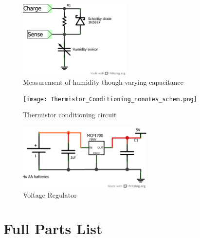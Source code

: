 \documentclass[a4paper,11pt]{article}  %
\begin{document}
\begin{figure}[!h]
  \begin{center}
    \includegraphics[width=0.5\textwidth]{humiditysensor_schem.png}
  \end{center}
  \caption{Measurement of humidity though varying capacitance}
  \label{fig:humcir}
\end{figure}

\begin{figure}[!h]
  \begin{center}
    \texttt{[image: Thermistor\_Conditioning\_nonotes\_schem.png]}
  \end{center}
  \caption{Thermistor conditioning circuit}
  \label{fig:tempcond}
\end{figure}

\begin{figure}[!h]
  \begin{center}
    \includegraphics[width=0.6\textwidth]{power_schem.png}
  \end{center}
  \caption{Voltage Regulator}
  \label{fig:voltreg}
\end{figure}

\section{Full Parts List}
\label{sec:full-parts-list}
\end{document}
